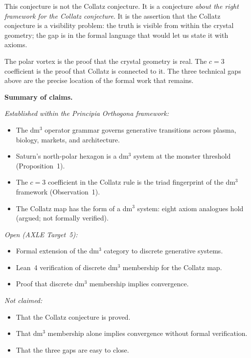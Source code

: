 \documentclass[11pt]{article}
\theoremstyle{plain}
\theoremstyle{definition}
\newenvironment{notebox}{%
  \begin{mdframed}[backgroundcolor=NoteBox,
    linecolor=PrincipiaDark!40,linewidth=0.5pt,
    innertopmargin=8pt,innerbottommargin=8pt,
    innerleftmargin=10pt,innerrightmargin=10pt]}
  {\end{mdframed}}
\begin{document}
This conjecture is not the Collatz conjecture. It is a conjecture
\textit{about the right framework for the Collatz conjecture}. It is
the assertion that the Collatz conjecture is a visibility problem:
the truth is visible from within the crystal geometry; the gap is in
the formal language that would let us state it with axioms.

The polar vortex is the proof that the crystal geometry is real.
The $c = 3$ coefficient is the proof that Collatz is connected to it.
The three technical gaps above are the precise location of the
formal work that remains.

\begin{notebox}
\textbf{Summary of claims.}

\medskip
\textit{Established within the Principia Orthogona framework:}
\begin{itemize}[leftmargin=*, itemsep=2pt]
  \item The dm$^3$ operator grammar governs generative transitions
    across plasma, biology, markets, and architecture.
  \item Saturn's north-polar hexagon is a dm$^3$ system at the
    monster threshold (Proposition~1).
  \item The $c = 3$ coefficient in the Collatz rule is the triad
    fingerprint of the dm$^3$ framework (Observation~1).
  \item The Collatz map has the form of a dm$^3$ system: eight axiom
    analogues hold (argued; not formally verified).
\end{itemize}

\medskip
\textit{Open (AXLE Target~5):}
\begin{itemize}[leftmargin=*, itemsep=2pt]
  \item Formal extension of the dm$^3$ category to discrete
    generative systems.
  \item Lean~4 verification of discrete dm$^3$ membership for the
    Collatz map.
  \item Proof that discrete dm$^3$ membership implies convergence.
\end{itemize}

\medskip
\textit{Not claimed:}
\begin{itemize}[leftmargin=*, itemsep=2pt]
  \item That the Collatz conjecture is proved.
  \item That dm$^3$ membership alone implies convergence without
    formal verification.
  \item That the three gaps are easy to close.
\end{itemize}
\end{notebox}
\end{document}
